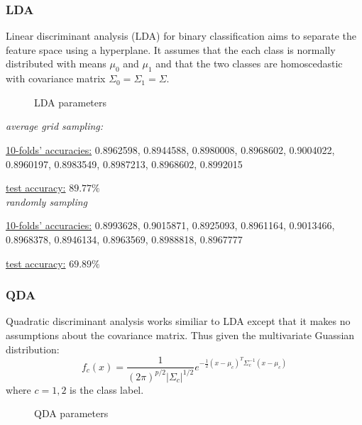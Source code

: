 \documentclass[12pt]{extarticle}
\begin{document}
\subsubsection{LDA}
Linear discriminant analysis (LDA) for binary classification aims to separate the feature space using a hyperplane.  It assumes that the each class is normally distributed with means $\mu_0$ and $\mu_1$ and that the two classes are homoscedastic with covariance matrix $\Sigma_0=\Sigma_1=\Sigma$. 

\begin{figure}[htb]
\centering
{}
\quad
{}

\caption{LDA parameters}\label{fig 1}
\end{figure}

\cdot \emph{average grid sampling:}

\underline{10-folds’ accuracies:}
0.8962598, 0.8944588, 0.8980008, 0.8968602, 0.9004022, 0.8960197, 0.8983549, 0.8987213, 0.8968602, 0.8992015


\underline{test accuracy:}  $89.77\%$\\

\cdot \emph{randomly sampling}

\underline{10-folds’ accuracies:}
0.8993628, 0.9015871, 0.8925093, 0.8961164, 0.9013466, 0.8968378, 0.8946134, 0.8963569, 0.8988818,
0.8967777


\underline{test accuracy:}  $ 69.89\%$

\subsubsection{QDA}
Quadratic discriminant analysis works similiar to LDA except that it makes no assumptions about the covariance matrix.  Thus given the multivariate Guassian distribution:
\begin{equation}
f_c(x) = \frac{1}{(2 \pi)^{p/2} \vert \Sigma_c \vert ^{1/2}} e^{-\frac{1}{2}(x-\mu_c)^T \Sigma_c^{-1} (x-\mu_c)}
\end{equation}
where $c=1,2$ is the class label.


\begin{figure}[htb]
\centering
{}
\quad
{}



\caption{QDA parameters}\label{fig 1}
\end{figure}
\end{document}
